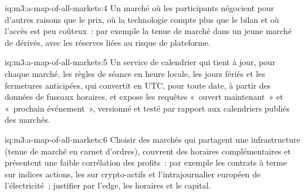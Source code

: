 \begin{solution}{iq:m3:a-map-of-all-markets:4}
Un marché où les participants négocient pour d'autres raisons que le prix, où la technologie compte plus que le bilan et où l'accès est peu coûteux~: par exemple la tenue de
marché dans un jeune marché de dérivés, avec les réserves liées au risque de plateforme.
\end{solution}

\begin{solution}{iq:m3:a-map-of-all-markets:5}
Un service de calendrier qui tient à jour, pour chaque marché, les règles de séance en heure locale, les jours fériés et les fermetures anticipées, qui convertit en UTC, pour toute date, à partir des données de fuseaux horaires, et expose
les requêtes «~ouvert maintenant~» et «~prochain événement~», versionné et testé par rapport aux calendriers publiés des marchés.
\end{solution}

\begin{solution}{iq:m3:a-map-of-all-markets:6}
Choisir des marchés qui partagent une infrastructure (tenue de marché en carnet d'ordres), couvrent des horaires complémentaires et présentent une faible corrélation des profits~: par exemple les contrats à terme sur indices
actions, les  sur crypto-actifs et l'intrajournalier européen de l'électricité~; justifier par l'edge, les horaires et le capital.
\end{solution}
